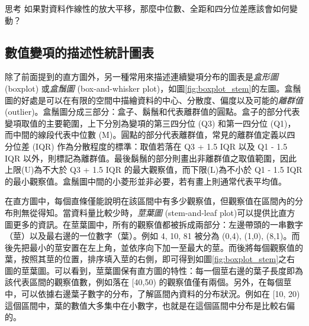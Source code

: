     \bigskip

    \begin{custom}{思考}
        如果對資料作線性的放大平移，那麼中位數、全距和四分位差應該會如何變動？
    \end{custom}

\subsection{數值變項的描述性統計圖表}
    除了前面提到的直方圖外，另一種常用來描述連續變項分布的圖表是\textit{盒形圖} (boxplot) 或\textit{盒鬚圖} (box-and-whisker plot)，如圖\ref{fig:boxplot_stem}的左圖。盒鬚圖的好處是可以在有限的空間中描繪資料的中心、分散度、偏度以及可能的\textit{離群值} (outlier)。盒鬚圖分成三部分：盒子、鬍鬚和代表離群值的圓點。盒子的部分代表變項取值的主要範圍，上下分別為變項的第三四分位 (Q3) 和第一四分位 (Q1)，而中間的線段代表中位數 (M)。圓點的部分代表離群值，常見的離群值定義以四分位差 (IQR) 作為分散程度的標準：取值若落在 Q3 + 1.5 IQR 以及 Q1 - 1.5 IQR 以外，則標記為離群值。最後鬍鬚的部分則畫出非離群值之取值範圍，因此上限(U)為不大於 Q3 + 1.5 IQR 的最大觀察值，而下限(L)為不小於 Q1 - 1.5 IQR 的最小觀察值。盒鬚圖中間的小菱形並非必要，若有畫上則通常代表平均值。

    在直方圖中，每個直條僅能說明在該區間中有多少觀察值，但觀察值在區間內的分布則無從得知。當資料量比較少時，\textit{莖葉圖} (stem-and-leaf plot)可以提供比直方圖更多的資訊。在莖葉圖中，所有的觀察值都被拆成兩部分：左邊帶頭的一串數字（莖）以及最右邊的一位數字（葉）。例如 4, 10, 81 被分為 (0,4), (1,0), (8,1)。而後先把最小的莖安置在左上角，並依序向下加一至最大的莖。而後將每個觀察值的葉，按照其莖的位置，排序填入莖的右側，即可得到如圖\ref{fig:boxplot_stem}之右圖的莖葉圖。可以看到，莖葉圖保有直方圖的特性：每一個莖右邊的葉子長度即為該代表區間的觀察值數，例如落在 [40,50) 的觀察值僅有兩個。另外，在每個莖中，可以依據右邊葉子數字的分布，了解區間內資料的分布狀況。例如在 [10, 20) 這個區間中，葉的數值大多集中在小數字，也就是在這個區間中分布是比較右偏的。

